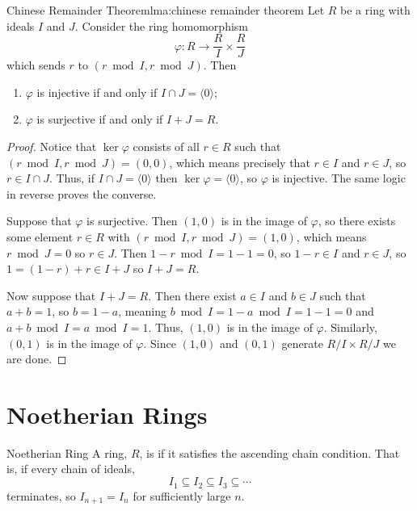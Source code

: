 \begin{lma}{Chinese Remainder Theorem}{lma:chinese remainder theorem}
    Let \(R\) be a ring with ideals \(I\) and \(J\).
    Consider the ring homomorphism
    \begin{equation}
        \varphi \colon R \to \frac{R}{I} \times \frac{R}{J}
    \end{equation}
    which sends \(r\) to \((r \bmod I, r \bmod J)\).
    Then
    \begin{enumerate}
        \item \(\varphi\) is injective if and only if \(I \cap J = \langle 0 \rangle\);
        \item \(\varphi\) is surjective if and only if \(I + J = R\).
    \end{enumerate}
    \begin{proof}
        Notice that \(\ker \varphi\) consists of all \(r \in R\) such that \((r \bmod I, r \bmod J) = (0, 0)\), which means precisely that \(r \in I\) and \(r \in J\), so \(r \in I \cap J\).
        Thus, if \(I \cap J = \langle 0 \rangle\) then \(\ker \varphi = \langle 0 \rangle\), so \(\varphi\) is injective.
        The same logic in reverse proves the converse.
        
        Suppose that \(\varphi\) is surjective.
        Then \((1, 0)\) is in the image of \(\varphi\), so there exists some element \(r \in R\) with \((r \bmod I, r \bmod J) = (1, 0)\), which means \(r \bmod J = 0\) so \(r \in J\).
        Then \(1 - r \bmod I = 1 - 1 = 0\), so \(1 - r \in I\) and \(r \in J\), so \(1 = (1 - r) + r \in I + J\) so \(I + J = R\).
        
        Now suppose that \(I + J = R\).
        Then there exist \(a \in I\) and \(b \in J\) such that \(a + b = 1\), so \(b = 1 - a\), meaning \(b \bmod I = 1 - a \bmod I = 1 - 1 = 0\) and \(a + b \bmod I = a \bmod I = 1\).
        Thus, \((1, 0)\) is in the image of \(\varphi\).
        Similarly, \((0, 1)\) is in the image of \(\varphi\).
        Since \((1, 0)\) and \((0, 1)\) generate \(R/I \times R/J\) we are done.
    \end{proof}
\end{lma}

\section{Noetherian Rings}
\begin{dfn}{Noetherian Ring}{}
    A ring, \(R\), is  if it satisfies the ascending chain condition.
    That is, if every chain of ideals,
    \begin{equation}
        I_1 \subseteq I_2 \subseteq I_3 \subseteq \dotsb
    \end{equation}
    terminates, so \(I_{n+1} = I_n\) for sufficiently large \(n\).
\end{dfn}

